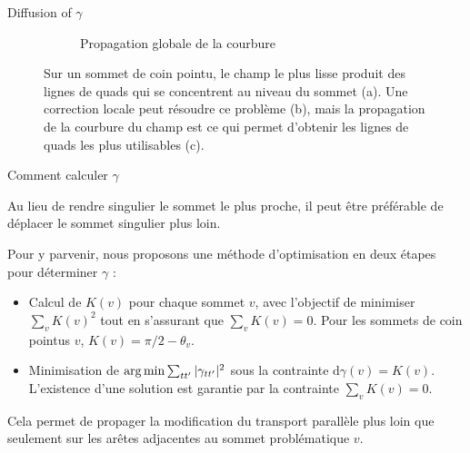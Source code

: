 \begin{frame}{Diffusion of $\gamma$}
\begin{figure}
\begin{subfigure}{.3\textwidth}
      \caption{Propagation globale de la courbure}
    \end{subfigure}%
    \caption{Sur un sommet de coin pointu, le champ le plus lisse produit des lignes de quads qui se concentrent au niveau du sommet (a). Une correction locale peut 
    résoudre ce problème (b), mais la propagation de la courbure du champ est ce qui permet d'obtenir les lignes de quads les plus utilisables (c).}
    \label{fig:cadff:sharp2}
    \end{figure}
    
\end{frame}
    
\begin{frame}{Comment calculer $\gamma$}

    Au lieu de rendre singulier le sommet le plus proche, il peut être préférable de déplacer le sommet singulier plus loin.
    
    Pour y parvenir, nous proposons une méthode d'optimisation en deux étapes pour déterminer $\gamma$ :
    \begin{itemize}
        \item Calcul de $K(v)$ pour chaque sommet $v$, avec l'objectif de minimiser $\sum_v K(v)^2$ tout en s'assurant que $\sum_v K(v)=0$. Pour les sommets de coin pointus $v$, $K(v) = \pi/2 - \theta_v$.
        \item Minimisation de $\operatorname*{arg\,min} \sum_{tt'}|\gamma_{tt'}|^2$ sous la contrainte $\mathrm{d}\gamma(v) = K(v)$. L'existence d'une solution est garantie par la contrainte $\sum_v K(v)=0$.
    \end{itemize}
    
    Cela permet de propager la modification du transport parallèle plus loin que seulement sur les arêtes adjacentes au sommet problématique $v$.
    
\end{frame}

